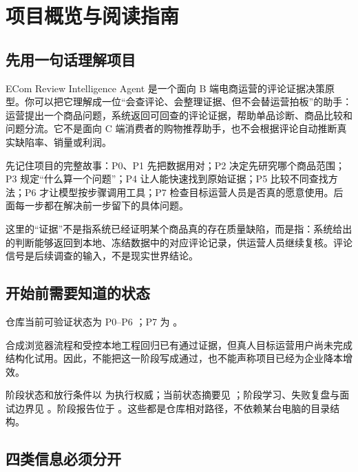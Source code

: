 \chapter{项目概览与阅读指南}

\section{先用一句话理解项目}

ECom Review Intelligence Agent 是一个面向 B 端电商运营的评论证据决策原型。你可以把它理解成一位“会查评论、会整理证据、但不会替运营拍板”的助手：运营提出一个商品问题，系统返回可回查的评论证据，帮助单品诊断、商品比较和问题分流。它不是面向 C 端消费者的购物推荐助手，也不会根据评论自动推断真实缺陷率、销量或利润。

\begin{beginnerbox}
先记住项目的完整故事：P0、P1 先把数据用对；P2 决定先研究哪个商品范围；P3 规定“什么算一个问题”；P4 让人能快速找到原始证据；P5 比较不同查找方法；P6 才让模型按步骤调用工具；P7 检查目标运营人员是否真的愿意使用。后面每一步都在解决前一步留下的具体问题。
\end{beginnerbox}

\begin{beginnerbox}
这里的“证据”不是指系统已经证明某个商品真的存在质量缺陷，而是指：系统给出的判断能够返回到本地、冻结数据中的对应评论记录，供运营人员继续复核。评论信号是后续调查的输入，不是现实世界结论。
\end{beginnerbox}

\section{开始前需要知道的状态}

\begin{factbox}
仓库当前可验证状态为 P0--P6 \statuspassed；P7 为 \statusprogress。

合成浏览器流程和受控本地工程回归已有通过证据，但真人目标运营用户尚未完成结构化试用。因此，不能把这一阶段写成通过，也不能声称项目已经为企业降本增效。
\end{factbox}

阶段状态和放行条件以  为执行权威；当前状态摘要见 ；阶段学习、失败复盘与面试边界见 。阶段报告位于 。这些都是仓库相对路径，不依赖某台电脑的目录结构。

\section{四类信息必须分开}

